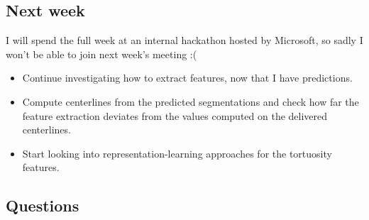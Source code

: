 \documentclass[11pt,a4paper]{article}
\begin{document}
\subsection{Next week}

I will spend the full week at an internal hackathon hosted by Microsoft, so sadly I won't be able
to join next week's meeting :(

\begin{itemize}
    \item Continue investigating how to extract features, now that I have predictions.
    \item Compute centerlines from the predicted segmentations and check how far the feature
    extraction deviates from the values computed on the delivered centerlines.
    \item Start looking into representation-learning approaches for the tortuosity features.
\end{itemize}

\subsection{Questions}
\end{document}
